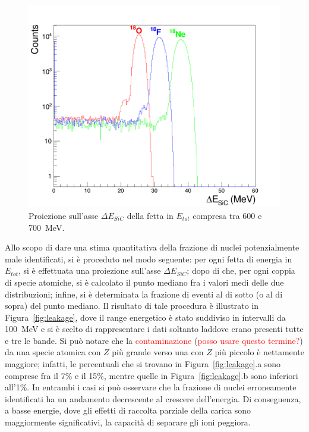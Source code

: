 \begin{figure} [!t]
	\centering
	\includegraphics[width=\textwidth, keepaspectratio]{Grafici_Tesi/Particelle_non_monocromatiche/fetta_quadrata.png}
	\caption{Proiezione sull'asse $\Delta E_{SiC}$ della fetta in $E_{tot}$ compresa tra 600 e 700~MeV.} \label{fig:fetta}
\end{figure}














Allo scopo di dare una stima quantitativa della frazione di nuclei potenzialmente male identificati, si è proceduto nel modo seguente: per ogni fetta di energia in $E_{tot}$, si è effettuata una proiezione sull'asse $\Delta E_{SiC}$; dopo di che, per ogni coppia di specie atomiche, si è calcolato il punto mediano fra i valori medi delle due distribuzioni; infine, si è determinata la frazione di eventi al di sotto (o al di sopra) del punto mediano.
Il risultato di tale procedura è illustrato in Figura~\ref{fig:leakage}, dove il range energetico è stato suddiviso in intervalli da 100~MeV e si è scelto di rappresentare i dati soltanto laddove erano presenti tutte e tre le bande.
Si può notare che la \textcolor{red}{contaminazione} (\textcolor{red}{posso usare questo termine?}) da una specie atomica con $Z$ più grande verso una con $Z$ più piccolo è nettamente maggiore; infatti, le percentuali che si trovano in Figura~\ref{fig:leakage}.a sono comprese fra il 7\% e il 15\%, mentre quelle in Figura~\ref{fig:leakage}.b sono inferiori all'1\%.
In entrambi i casi si può osservare che la frazione di nuclei erroneamente identificati ha un andamento decrescente al crescere dell'energia.
Di conseguenza, a basse energie, dove gli effetti di raccolta parziale della carica sono maggiormente significativi, la capacità di separare gli ioni peggiora.

